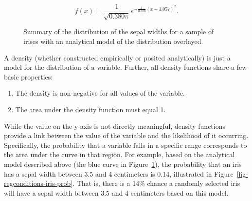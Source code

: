 \documentclass[
  letterpaper,
  DIV=11,
  numbers=noendperiod]{scrreprt}
\providecommand{\tightlist}{%
  \setlength{\itemsep}{0pt}\setlength{\parskip}{0pt}}\usepackage{longtable,booktabs,array}
\theoremstyle{plain}
\theoremstyle{definition}
\theoremstyle{definition}
\theoremstyle{remark}
\begin{document}
\[f(x) = \frac{1}{\sqrt{0.380\pi}} e^{-\frac{1}{0.380}(x - 3.057)^2}.\]

\begin{figure}


\caption{\label{fig-regconditions-iris-normal}Summary of the
distribution of the sepal widths for a sample of irises with an
analytical model of the distribution overlayed.}

\end{figure}%

A density (whether constructed empirically or posited analytically) is
just a model for the distribution of a variable. Further, all density
functions share a few basic properties:

\begin{enumerate}
\def\labelenumi{\arabic{enumi}.}
\tightlist
\item
  The density is non-negative for all values of the variable.
\item
  The area under the density function must equal 1.
\end{enumerate}

While the value on the y-axis is not directly meaningful, density
functions provide a link between the value of the variable and the
likelihood of it occurring. Specifically, the probability that a
variable falls in a specific range corresponds to the area under the
curve in that region. For example, based on the analytical model
described above (the blue curve in
Figure~\ref{fig-regconditions-iris-normal}), the probability that an
iris has a sepal width between 3.5 and 4 centimeters is 0.14,
illustrated in Figure~\ref{fig-regconditions-iris-prob}. That is, there
is a 14\% chance a randomly selected iris will have a sepal width
between 3.5 and 4 centimeters based on this model.
\end{document}
